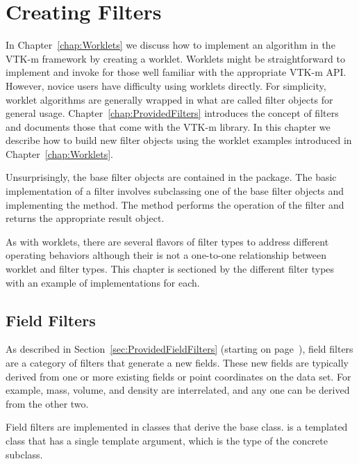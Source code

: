 
\chapter{Creating Filters}
\label{chap:CreatingFilters}


In Chapter~\ref{chap:Worklets} we discuss how to implement an algorithm in the VTK-m framework by creating a worklet.
Worklets might be straightforward to implement and invoke for those well familiar with the appropriate VTK-m API.
However, novice users have difficulty using worklets directly.
For simplicity, worklet algorithms are generally wrapped in what are called filter objects for general usage.
Chapter~\ref{chap:ProvidedFilters} introduces the concept of filters and documents those that come with the VTK-m library.
In this chapter we describe how to build new filter objects using the worklet examples introduced in Chapter~\ref{chap:Worklets}.

Unsurprisingly, the base filter objects are contained in the \vtkmfilter{} package.
The basic implementation of a filter involves subclassing one of the base filter objects and implementing the  method.
The  method performs the operation of the filter and returns the appropriate result object.

As with worklets, there are several flavors of filter types to address different operating behaviors although their is not a one-to-one relationship between worklet and filter types.
This chapter is sectioned by the different filter types with an example of implementations for each.

\section{Field Filters}


As described in Section~\ref{sec:ProvidedFieldFilters} (starting on page~\pageref{sec:ProvidedFieldFilters}), field filters are a category of filters that generate a new fields.
These new fields are typically derived from one or more existing fields or point coordinates on the data set.
For example, mass, volume, and density are interrelated, and any one can be derived from the other two.

Field filters are implemented in classes that derive the  base class.
 is a templated class that has a single template argument, which is the type of the concrete subclass.

